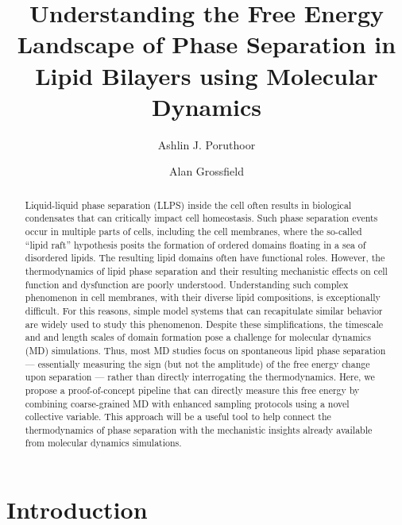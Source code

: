 \documentclass{biophys-new}
\title{Understanding the Free Energy Landscape of Phase Separation in Lipid Bilayers using Molecular Dynamics}
\author[1]{Ashlin J. Poruthoor}
\author[1,*]{Alan Grossfield}
\affil[1]{University of Rochester Medical Center, Rochester, NY 14620}
\begin{document}
\begin{frontmatter}
\begin{abstract}

Liquid-liquid phase separation (LLPS) inside the cell often results in biological condensates that can critically impact
cell homeostasis. Such phase separation events occur in multiple parts of cells, including
the cell membranes, where the so-called ``lipid raft'' hypothesis posits the formation of ordered domains floating in a sea
of disordered lipids. The resulting lipid domains often have functional roles.
However, the thermodynamics of lipid phase separation and their resulting
mechanistic effects on cell function and dysfunction are poorly understood. Understanding such complex phenomenon in cell
membranes, with their diverse lipid compositions, is exceptionally difficult. For this reasons, simple model systems that can recapitulate similar behavior are
widely used to study this phenomenon. Despite these simplifications, the timescale and and length scales of domain formation
pose a challenge for molecular dynamics (MD) simulations.
Thus, most MD studies focus on spontaneous lipid phase separation --- essentially measuring the sign (but not the amplitude) of the free energy change upon separation --- rather than directly interrogating the thermodynamics.  Here, we propose a proof-of-concept pipeline that can 
directly measure this free energy by combining coarse-grained MD with enhanced sampling protocols using a novel collective variable. This approach will be a useful tool to help connect the thermodynamics of phase separation with the mechanistic insights already available from molecular dynamics simulations.


\end{abstract}

\end{frontmatter}

\section*{Introduction}
\end{document}
